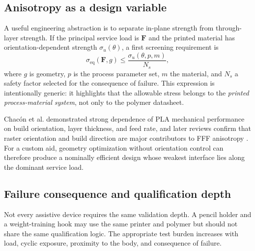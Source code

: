 \documentclass[11pt]{article}
\begin{document}
\subsection{Anisotropy as a design variable}

A useful engineering abstraction is to separate in-plane strength from through-layer strength. If the principal service load is $\mathbf{F}$ and the printed material has orientation-dependent strength $\sigma_u(\theta)$, a first screening requirement is
\begin{equation}
  \sigma_{\mathrm{eq}}(\mathbf{F},g) \leq \frac{\sigma_u(\theta,p,m)}{N_s},
\end{equation}
where $g$ is geometry, $p$ is the process parameter set, $m$ the material, and $N_s$ a safety factor selected for the consequence of failure. This expression is intentionally generic: it highlights that the allowable stress belongs to the \emph{printed process-material system}, not only to the polymer datasheet.

Chac{\'o}n et al. demonstrated strong dependence of PLA mechanical performance on build orientation, layer thickness, and feed rate, and later reviews confirm that raster orientation and build direction are major contributors to FFF anisotropy \cite{chacon2017,cojocaru2022}. For a custom aid, geometry optimization without orientation control can therefore produce a nominally efficient design whose weakest interface lies along the dominant service load.

\subsection{Failure consequence and qualification depth}

Not every assistive device requires the same validation depth. A pencil holder and a weight-training hook may use the same printer and polymer but should not share the same qualification logic. The appropriate test burden increases with load, cyclic exposure, proximity to the body, and consequence of failure.
\end{document}
